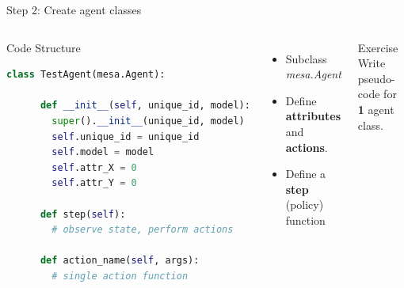 \documentclass{beamer}
\begin{document}
\begin{frame}[fragile]{Step 2: Create agent classes}
    \begin{columns}
        \begin{block}{Code Structure}
            \begin{lstlisting}[language=Python, basicstyle=\footnotesize, xleftmargin=-16pt, columns=fullflexible]
    class TestAgent(mesa.Agent):
      
      def __init__(self, unique_id, model):
        super().__init__(unique_id, model)
        self.unique_id = unique_id
        self.model = model
        self.attr_X = 0
        self.attr_Y = 0
        
      def step(self):
        # observe state, perform actions
      
      def action_name(self, args):
        # single action function
    
    \end{lstlisting}
        \end{block}

        \begin{itemize}
            \item Subclass \textit{mesa.Agent}
            \item Define \textbf{attributes} and \textbf{actions}.
            \item Define a \textbf{step} (policy) function
        \end{itemize}
        \bigskip
        \begin{block}{Exercise}
            Write pseudo-code for \textbf{1} agent class.
        \end{block}
    \end{columns}

\end{frame}
\end{document}
